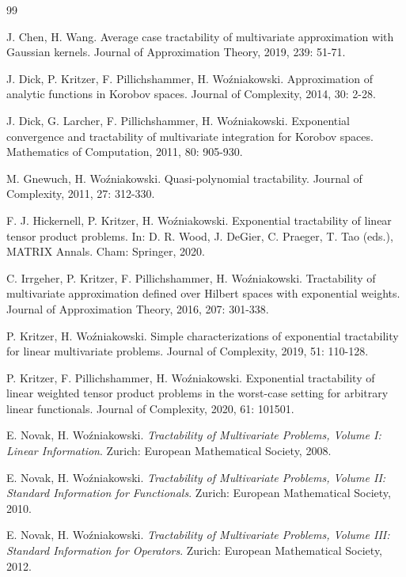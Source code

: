 \documentclass{amsart}
\numberwithin{equation}{section}
\begin{document}
\begin{thebibliography}{99}

 J. Chen, H. Wang. Average case tractability of multivariate approximation with Gaussian kernels.
Journal of Approximation Theory, 2019, 239: 51-71.

 J. Dick, P. Kritzer, F. Pillichshammer, H. Wo\'zniakowski. Approximation of analytic functions in Korobov spaces.
Journal of Complexity, 2014, 30: 2-28.

 J. Dick, G. Larcher, F. Pillichshammer, H. Wo\'zniakowski. Exponential convergence and tractability
of multivariate integration for Korobov spaces. Mathematics of Computation, 2011, 80: 905-930.

 M. Gnewuch, H. Wo\'zniakowski. Quasi-polynomial tractability. Journal of Complexity, 2011, 27: 312-330.

 F. J. Hickernell, P. Kritzer, H. Wo\'zniakowski. Exponential tractability of linear
tensor product problems. In: D. R. Wood, J. DeGier, C. Praeger, T. Tao (eds.), MATRIX Annals. Cham: Springer, 2020.

 C. Irrgeher, P. Kritzer, F. Pillichshammer, H. Wo\'zniakowski.
Tractability of multivariate approximation defined over Hilbert spaces with exponential weights.
Journal of Approximation Theory, 2016, 207: 301-338.

 P. Kritzer, H. Wo\'zniakowski. Simple characterizations of exponential tractability for linear multivariate
problems. Journal of Complexity, 2019, 51: 110-128.

 P. Kritzer, F. Pillichshammer, H. Wo\'zniakowski. Exponential tractability of linear
 weighted tensor product problems in the worst-case setting for arbitrary linear functionals. {Journal of Complexity}, 2020, 61: 101501.

 E. Novak, H. Wo\'zniakowski. \textit{Tractability of Multivariate Problems, Volume I: Linear Information}.
 Zurich: European Mathematical Society, 2008.

 E. Novak, H. Wo\'zniakowski. \textit{Tractability of Multivariate Problems, Volume II: Standard Information for Functionals}.
Zurich: European Mathematical Society, 2010.

 E. Novak, H. Wo\'zniakowski. \textit{Tractability of Multivariate Problems, Volume III: Standard Information for Operators}.
Zurich: European Mathematical Society, 2012.


\end{thebibliography}
\end{document}
